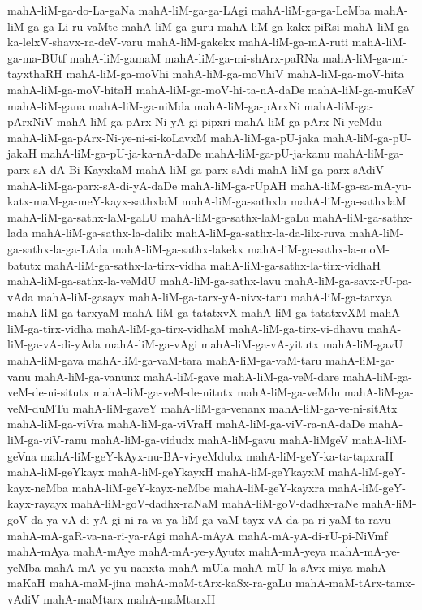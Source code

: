 {mahA-liM-ga-do-La-gaNa
mahA-liM-ga-ga-LAgi
mahA-liM-ga-ga-LeMba
mahA-liM-ga-ga-Li-ru-vaMte
mahA-liM-ga-guru
mahA-liM-ga-kakx-piRsi
mahA-liM-ga-ka-lelxV-shavx-ra-deV-varu
mahA-liM-gakekx
mahA-liM-ga-mA-ruti
mahA-liM-ga-ma-BUtf
mahA-liM-gamaM
mahA-liM-ga-mi-shArx-paRNa
mahA-liM-ga-mi-tayxthaRH
mahA-liM-ga-moVhi
mahA-liM-ga-moVhiV
mahA-liM-ga-moV-hita
mahA-liM-ga-moV-hitaH
mahA-liM-ga-moV-hi-ta-nA-daDe
mahA-liM-ga-muKeV
mahA-liM-gana
mahA-liM-ga-niMda
mahA-liM-ga-pArxNi
mahA-liM-ga-pArxNiV
mahA-liM-ga-pArx-Ni-yA-gi-pipxri
mahA-liM-ga-pArx-Ni-yeMdu
mahA-liM-ga-pArx-Ni-ye-ni-si-koLavxM
mahA-liM-ga-pU-jaka
mahA-liM-ga-pU-jakaH
mahA-liM-ga-pU-ja-ka-nA-daDe
mahA-liM-ga-pU-ja-kanu
mahA-liM-ga-parx-sA-dA-Bi-KayxkaM
mahA-liM-ga-parx-sAdi
mahA-liM-ga-parx-sAdiV
mahA-liM-ga-parx-sA-di-yA-daDe
mahA-liM-ga-rUpAH
mahA-liM-ga-sa-mA-yu-katx-maM-ga-meY-kayx-sathxlaM
mahA-liM-ga-sathxla
mahA-liM-ga-sathxlaM
mahA-liM-ga-sathx-laM-gaLU
mahA-liM-ga-sathx-laM-gaLu
mahA-liM-ga-sathx-lada
mahA-liM-ga-sathx-la-dalilx
mahA-liM-ga-sathx-la-da-lilx-ruva
mahA-liM-ga-sathx-la-ga-LAda
mahA-liM-ga-sathx-lakekx
mahA-liM-ga-sathx-la-moM-batutx
mahA-liM-ga-sathx-la-tirx-vidha
mahA-liM-ga-sathx-la-tirx-vidhaH
mahA-liM-ga-sathx-la-veMdU
mahA-liM-ga-sathx-lavu
mahA-liM-ga-savx-rU-pa-vAda
mahA-liM-gasayx
mahA-liM-ga-tarx-yA-nivx-taru
mahA-liM-ga-tarxya
mahA-liM-ga-tarxyaM
mahA-liM-ga-tatatxvX
mahA-liM-ga-tatatxvXM
mahA-liM-ga-tirx-vidha
mahA-liM-ga-tirx-vidhaM
mahA-liM-ga-tirx-vi-dhavu
mahA-liM-ga-vA-di-yAda
mahA-liM-ga-vAgi
mahA-liM-ga-vA-yitutx
mahA-liM-gavU
mahA-liM-gava
mahA-liM-ga-vaM-tara
mahA-liM-ga-vaM-taru
mahA-liM-ga-vanu
mahA-liM-ga-vanunx
mahA-liM-gave
mahA-liM-ga-veM-dare
mahA-liM-ga-veM-de-ni-situtx
mahA-liM-ga-veM-de-nitutx
mahA-liM-ga-veMdu
mahA-liM-ga-veM-duMTu
mahA-liM-gaveY
mahA-liM-ga-venanx
mahA-liM-ga-ve-ni-sitAtx
mahA-liM-ga-viVra
mahA-liM-ga-viVraH
mahA-liM-ga-viV-ra-nA-daDe
mahA-liM-ga-viV-ranu
mahA-liM-ga-vidudx
mahA-liM-gavu
mahA-liMgeV
mahA-liM-geVna
mahA-liM-geY-kAyx-nu-BA-vi-yeMdubx
mahA-liM-geY-ka-ta-tapxraH
mahA-liM-geYkayx
mahA-liM-geYkayxH
mahA-liM-geYkayxM
mahA-liM-geY-kayx-neMba
mahA-liM-geY-kayx-neMbe
mahA-liM-geY-kayxra
mahA-liM-geY-kayx-rayayx
mahA-liM-goV-dadhx-raNaM
mahA-liM-goV-dadhx-raNe
mahA-liM-goV-da-ya-vA-di-yA-gi-ni-ra-va-ya-liM-ga-vaM-tayx-vA-da-pa-ri-yaM-ta-ravu
mahA-mA-gaR-va-na-ri-ya-rAgi
mahA-mAyA
mahA-mA-yA-di-rU-pi-NiVmf
mahA-mAya
mahA-mAye
mahA-mA-ye-yAyutx
mahA-mA-yeya
mahA-mA-ye-yeMba
mahA-mA-ye-yu-nanxta
mahA-mUla
mahA-mU-la-sAvx-miya
mahA-maKaH
mahA-maM-jina
mahA-maM-tArx-kaSx-ra-gaLu
mahA-maM-tArx-tamx-vAdiV
mahA-maMtarx
mahA-maMtarxH
}
